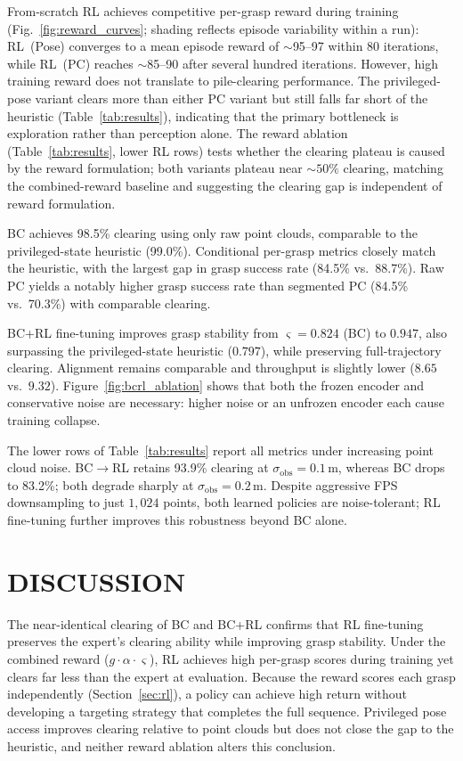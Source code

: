 \documentclass[letterpaper, 10 pt, conference]{ieeeconf}
\begin{document}
From-scratch RL achieves competitive per-grasp reward during training (Fig.~\ref{fig:reward_curves}; shading reflects episode variability within a run): RL~(Pose) converges to a mean episode reward of $\sim$95--97 within 80 iterations, while RL~(PC) reaches $\sim$85--90 after several hundred iterations.
However, high training reward does not translate to pile-clearing performance.
The privileged-pose variant clears more than either PC variant but still falls far short of the heuristic (Table~\ref{tab:results}), indicating that the primary bottleneck is exploration rather than perception alone.
The reward ablation (Table~\ref{tab:results}, lower RL rows) tests whether the clearing plateau is caused by the reward formulation; both variants plateau near ${\sim}50\%$ clearing, matching the combined-reward baseline and suggesting the clearing gap is independent of reward formulation.

BC achieves 98.5\% clearing using only raw point clouds, comparable to the privileged-state heuristic (99.0\%).
Conditional per-grasp metrics closely match the heuristic, with the largest gap in grasp success rate (84.5\% vs.\ 88.7\%).
Raw PC yields a notably higher grasp success rate than segmented PC (84.5\% vs.\ 70.3\%) with comparable clearing.

BC+RL fine-tuning improves grasp stability from $\varsigma = 0.824$ (BC) to $0.947$, also surpassing the privileged-state heuristic ($0.797$), while preserving full-trajectory clearing.
Alignment remains comparable and throughput is slightly lower ($8.65$ vs.\ $9.32$).
Figure~\ref{fig:bcrl_ablation} shows that both the frozen encoder and conservative noise are necessary: higher noise or an unfrozen encoder each cause training collapse.

The lower rows of Table~\ref{tab:results} report all metrics under increasing point cloud noise.
BC$\to$RL retains 93.9\% clearing at $\sigma_{\mathrm{obs}} = 0.1$\,m, whereas BC drops to 83.2\%; both degrade sharply at $\sigma_{\mathrm{obs}} = 0.2$\,m.
Despite aggressive FPS downsampling to just $1{,}024$ points, both learned policies are noise-tolerant; RL fine-tuning further improves this robustness beyond BC alone.

\section{DISCUSSION}
The near-identical clearing of BC and BC+RL confirms that RL fine-tuning preserves the expert's clearing ability while improving grasp stability. Under the combined reward ($g \cdot \alpha \cdot \varsigma$), RL achieves high per-grasp scores during training yet clears far less than the expert at evaluation. Because the reward scores each grasp independently (Section~\ref{sec:rl}), a policy can achieve high return without developing a targeting strategy that completes the full sequence. Privileged pose access improves clearing relative to point clouds but does not close the gap to the heuristic, and neither reward ablation alters this conclusion.
\end{document}
